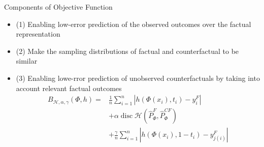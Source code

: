\documentclass{beamer}
\begin{document}
	\begin{frame}{Components of Objective Function}
		\begin{itemize}
			\item (1) Enabling low-error prediction of the observed outcomes over the factual representation
			\item (2) Make the sampling distributions of factual and counterfactual to be similar
			\item (3) Enabling lowe-rror prediction of unobserved counterfactuals by taking
			into account relevant factual outcomes
			\begin{align}
			B_{\mathcal{H}, \alpha, \gamma}(\Phi, h)=&\frac{1}{n} \sum_{i=1}^{n}\left|h\left(\Phi\left(x_{i}\right), t_{i}\right)-y_{i}^{F}\right|\\
			 &+ \alpha \operatorname{disc} \mathcal{H}\left(\hat{P}_{\Phi}^{F}, \hat{P}_{\Phi}^{C F}\right)\\
			 &+\frac{\gamma}{n} \sum_{i=1}^{n}\left|h\left(\Phi\left(x_{i}\right), 1-t_{i}\right)-y_{j(i)}^{F}\right|
			\end{align}
		\end{itemize}
	\end{frame}
\end{document}
